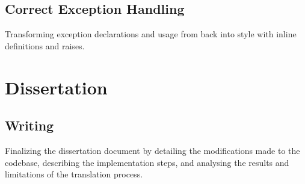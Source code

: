 \subsection{Correct Exception Handling}

Transforming exception declarations and usage from \cml back into \ocaml style with inline definitions and raises.

\section{Dissertation}

\subsection{Writing}

Finalizing the dissertation document by detailing the modifications made to the codebase, describing the implementation 
steps, and analysing the results and limitations of the translation process.

